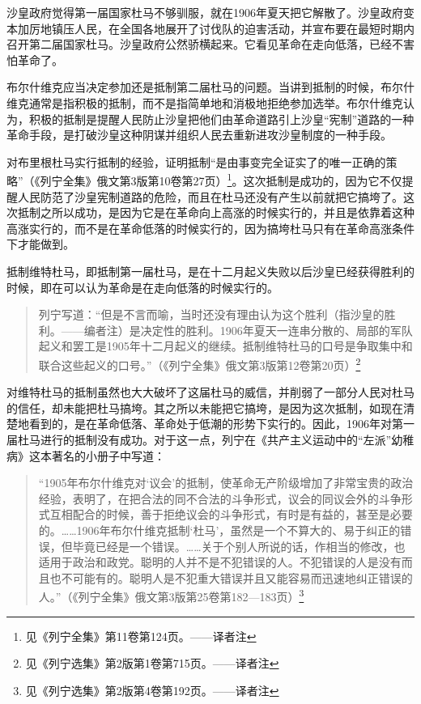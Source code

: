 沙皇政府觉得第一届国家杜马不够驯服，就在1906年夏天把它解散了。沙皇政府变本加厉地镇压人民，在全国各地展开了讨伐队的迫害活动，并宣布要在最短时期内召开第二届国家杜马。沙皇政府公然骄横起来。它看见革命在走向低落，已经不害怕革命了。

布尔什维克应当决定参加还是抵制第二届杜马的问题。当讲到抵制的时候，布尔什维克通常是指积极的抵制，而不是指简单地和消极地拒绝参加选举。布尔什维克认为，积极的抵制是提醒人民防止沙皇把他们由革命道路引上沙皇“宪制”道路的一种革命手段，是打破沙皇这种阴谋并组织人民去重新进攻沙皇制度的一种手段。

对布里根杜马实行抵制的经验，证明抵制“是由事变完全证实了的唯一正确的策略”（《列宁全集》俄文第3版第10卷第27页）\footnote{见《列宁全集》第11卷第124页。——译者注}。这次抵制是成功的，因为它不仅提醒人民防范了沙皇宪制道路的危险，而且在杜马还没有产生以前就把它搞垮了。这次抵制之所以成功，是因为它是在革命向上高涨的时候实行的，并且是依靠着这种高涨实行的，而不是在革命低落的时候实行的，因为搞垮杜马只有在革命高涨条件下才能做到。

抵制维特杜马，即抵制第一届杜马，是在十二月起义失败以后沙皇已经获得胜利的时候，即在可以认为革命是在走向低落的时候实行的。

\begin{quotation}
列宁写道：“但是不言而喻，当时还没有理由认为这个胜利（指沙皇的胜利。——编者注）是决定性的胜利。1906年夏天一连串分散的、局部的军队起义和罢工是1905年十二月起义的继续。抵制维特杜马的口号是争取集中和联合这些起义的口号。”（《列宁全集》俄文第3版第12卷第20页）\footnote{见《列宁选集》第2版第1卷第715页。——译者注}
\end{quotation}

对维特杜马的抵制虽然也大大破坏了这届杜马的威信，并削弱了一部分人民对杜马的信任，却未能把杜马搞垮。其之所以未能把它搞垮，是因为这次抵制，如现在清楚地看到的，是在革命低落、革命处于低潮的形势下实行的。因此，1906年对第一届杜马进行的抵制没有成功。对于这一点，列宁在《共产主义运动中的“左派”幼稚病》这本著名的小册子中写道：

\begin{quotation}
“1905年布尔什维克对‘议会’的抵制，使革命无产阶级增加了非常宝贵的政治经验，表明了，在把合法的同不合法的斗争形式，议会的同议会外的斗争形式互相配合的时候，善于拒绝议会的斗争形式，有时是有益的，甚至是必要的。……1906年布尔什维克抵制‘杜马’，虽然是一个不算大的、易于纠正的错误，但毕竟已经是一个错误。……关于个别人所说的话，作相当的修改，也适用于政治和政党。聪明的人并不是不犯错误的人。不犯错误的人是没有而且也不可能有的。聪明人是不犯重大错误并且又能容易而迅速地纠正错误的人。”（《列宁全集》俄文第3版第25卷第182—183页）\footnote{见《列宁选集》第2版第4卷第192页。——译者注}
\end{quotation}

